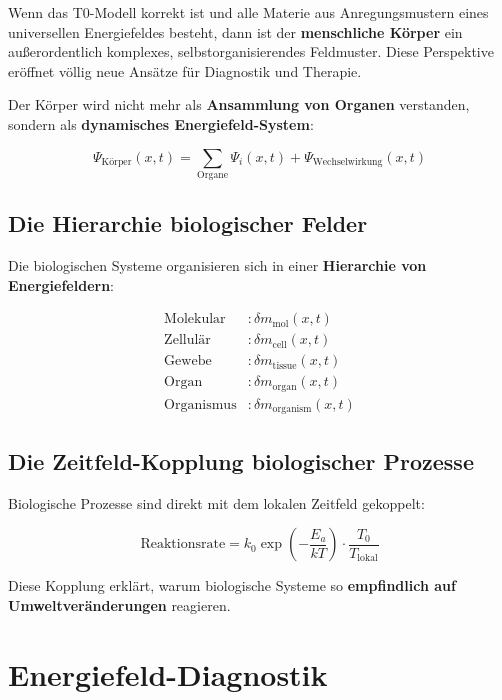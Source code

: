 \documentclass[12pt,a4paper]{report}
\begin{document}
	Wenn das T0-Modell korrekt ist und alle Materie aus Anregungsmustern eines universellen Energiefeldes besteht, dann ist der \textbf{menschliche Körper} ein außerordentlich komplexes, selbstorganisierendes Feldmuster. Diese Perspektive eröffnet völlig neue Ansätze für Diagnostik und Therapie.
	
	Der Körper wird nicht mehr als \textbf{Ansammlung von Organen} verstanden, sondern als \textbf{dynamisches Energiefeld-System}:
	
	\begin{equation}
		\Psi_{\text{Körper}}(x,t) = \sum_{\text{Organe}} \Psi_i(x,t) + \Psi_{\text{Wechselwirkung}}(x,t)
	\end{equation}
	
	\subsection{Die Hierarchie biologischer Felder}
	
	Die biologischen Systeme organisieren sich in einer \textbf{Hierarchie von Energiefeldern}:
	
	\begin{align}
		\text{Molekular} &: \delta m_{\text{mol}}(x,t) \\
		\text{Zellulär} &: \delta m_{\text{cell}}(x,t) \\
		\text{Gewebe} &: \delta m_{\text{tissue}}(x,t) \\
		\text{Organ} &: \delta m_{\text{organ}}(x,t) \\
		\text{Organismus} &: \delta m_{\text{organism}}(x,t)
	\end{align}
	
	\subsection{Die Zeitfeld-Kopplung biologischer Prozesse}
	
	Biologische Prozesse sind direkt mit dem lokalen Zeitfeld gekoppelt:
	
	\begin{equation}
		\text{Reaktionsrate} = k_0 \exp\left(-\frac{E_a}{kT}\right) \cdot \frac{T_0}{T_{\text{lokal}}}
	\end{equation}
	
	Diese Kopplung erklärt, warum biologische Systeme so \textbf{empfindlich auf Umweltveränderungen} reagieren.
	
	\section{Energiefeld-Diagnostik}
	
\end{document}
